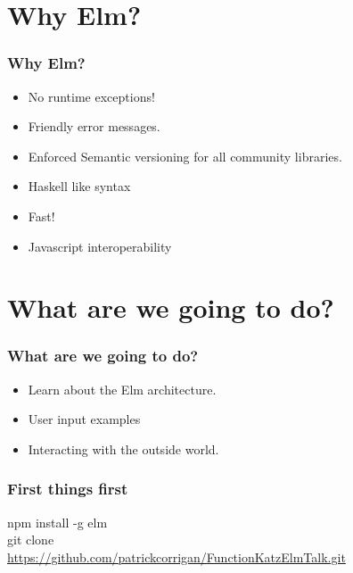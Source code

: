 \documentclass[aspectratio=1610]{beamer}
\begin{document}
\section{Why Elm?} %
\begin{frame}
\frametitle{Why Elm?}
    \begin{itemize}
      \item No runtime exceptions!
      \item Friendly error messages.
      \item Enforced Semantic versioning for all community libraries.
      \item Haskell like syntax
      \item Fast!
      \item Javascript interoperability
    \end{itemize}
\end{frame} 
\section{What are we going to do?} %
\begin{frame}
\frametitle{What are we going to do?}
    \begin{itemize}
      \item Learn about the Elm architecture.
      \item User input examples
      \item Interacting with the outside world.
    \end{itemize}
\end{frame} 

\begin{frame}[c]
\frametitle{First things first}

\begin{center}
     \Huge npm install -g elm \\
     \vspace{1cm}
     \Huge git clone \\
     \vspace{0.5cm}
     \Large \url{https://github.com/patrickcorrigan/FunctionKatzElmTalk.git}
\end{center}

\end{frame}
\end{document}
